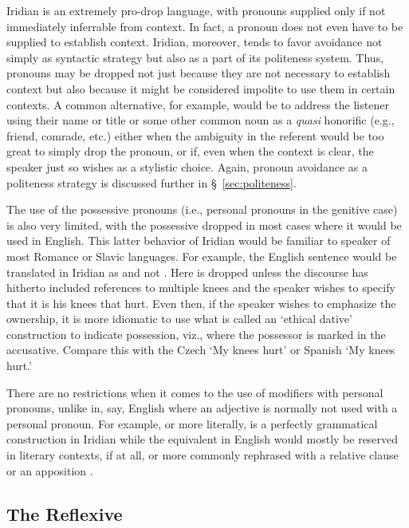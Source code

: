 Iridian is an extremely pro-drop language, with pronouns supplied only if not
immediately inferrable from context. In fact, a pronoun does not even have to be
supplied to establish context. Iridian, moreover, tends to favor avoidance not
simply as syntactic strategy but also as a part of its politeness system. Thus,
pronouns may be dropped not just because they are not necessary to establish
context but also because it might be considered impolite to use them in certain
contexts. A common alternative, for example, would be to address the listener
using their name or title or some other common noun as a \emph{quasi} honorific
(e.g., friend, comrade, etc.) either when the ambiguity in the referent would be
too great to simply drop the pronoun, or if, even when the context is clear, the
speaker just so wishes as a stylistic choice. Again, pronoun avoidance as a
politeness strategy is discussed further in \S~\ref{sec:politeness}.

The use of the possessive pronouns (i.e., personal pronouns in the genitive
case) is also very limited, with the possessive dropped in most cases where it
would be used in English. This latter behavior of Iridian would be familiar to
speaker of most Romance or Slavic languages. For example, the English sentence
 would be translated in Iridian as  and
not . Here  is dropped unless the discourse
has hitherto included references to multiple knees and the speaker wishes to
specify that it is his knees that hurt. Even then, if the speaker wishes to
emphasize the ownership, it is more idiomatic to use what is called an `ethical
dative' construction to indicate possession, viz.,
 where the possessor is marked in the accusative. Compare
this with the Czech  `My knees hurt' or Spanish
 `My knees hurt.'

There are no restrictions when it comes to the use of modifiers with personal
pronouns, unlike in, say, English where an adjective is normally not used with a
personal pronoun. For example,  or more
literally,  is a perfectly grammatical construction in
Iridian while the equivalent in English would mostly be reserved in literary
contexts, if at all, or more commonly rephrased with a relative clause  or an apposition .

\subsection{The Reflexive }\label{sec:reflexive-se}

